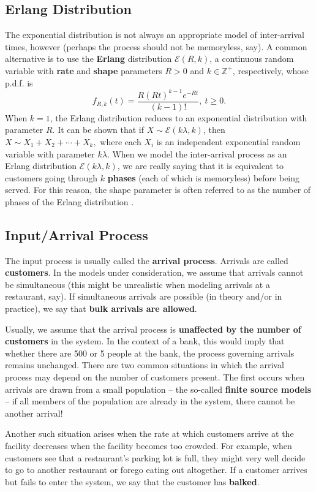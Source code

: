 \subsection{Erlang Distribution}
The exponential distribution is not always an appropriate model of inter-arrival times, however (perhaps the process should not be memoryless, say). A common alternative is to use the \textbf{Erlang} distribution $\mathcal{E}(R,k)$, a continuous random variable with \textbf{rate} and \textbf{shape} parameters $R>0$ and $k\in \mathbb{Z}^+$, respectively, whose p.d.f. is  
$$ f_{R,k}(t) = \frac{R (Rt)^{k-1} e^{-Rt}}{(k-1)!},\ t\geq 0.$$
When $k=1$, the Erlang distribution reduces to an exponential distribution with parameter $R$. It can be shown that if $X\sim \mathcal{E}(k\lambda,k)$, then  $X\sim X_{1}+X_{2}+\cdots+X_{k},$ where each $X_{i}$ is an independent exponential random variable with parameter $k \lambda$. \newl When we model the inter-arrival process as an Erlang distribution $\mathcal{E}(k\lambda,k)$, we are really saying that it is equivalent to customers going through $k$ \textbf{phases} (each of which is memoryless) before being served. For this reason, the shape parameter is often referred to as the number of phases of the Erlang distribution \cite{QS_N}.
\subsection{Input/Arrival Process}
The input process is usually called the \textbf{arrival process}. Arrivals are called \textbf{customers}. In the models under consideration, we assume that arrivals cannot be simultaneous (this might be unrealistic when modeling arrivals at a restaurant, say). If simultaneous arrivals are possible (in theory and/or in practice), we say that \textbf{bulk arrivals are allowed}. 
\par Usually, we assume that the arrival process is \textbf{unaffected by the number of customers} in the system. In the context of a bank, this would imply that whether there are 500 or 5 people at the bank, the process governing arrivals remains unchanged.  
\newl There are two common situations in which the arrival process may depend on the number of customers present. The first occurs when arrivals are drawn from a small population -- the so-called \textbf{finite source models} -- if all members of the population are already in the system, there cannot be another arrival!\par Another such situation arises when the rate at which customers arrive at the facility decreases when the facility becomes too crowded. For example, when customers see that a restaurant's parking lot is full, they might very well decide to go to another restaurant or forego eating out altogether. If a customer arrives but fails to enter the system, we say that the customer has \textbf{balked}.
